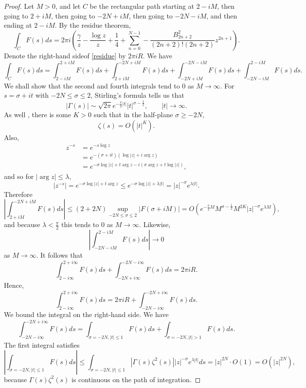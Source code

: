 \documentclass{article}
\begin{document}
\begin{proof}
Let $M>0$,
and let $C$ be the rectangular path  starting at $2-iM$, then going to $2+iM$, then going to $-2N+iM$,  then going to $-2N-iM$, and then ending 
at $2-iM$. 
By the residue theorem,
\begin{equation}
\int_C F(s) ds = 2\pi i\left(\frac{\gamma}{z}-\frac{\log z}{z}+\frac{1}{4} + \sum_{n=0}^{N-1}  -\frac{B_{2n+2}^2}{(2n+2)!(2n+2)} z^{2n+1}
\right).
\label{residue}
\end{equation}
Denote the right-hand sideof \eqref{residue}  by $2\pi i R$.
We have
\[
\int_C F(s) ds = 
\int_{2-iM}^{2+iM} F(s) ds + \int_{2+iM}^{-2N+iM} F(s) ds
+ \int_{-2N+iM}^{-2N-iM} F(s) ds +
\int_{-2N-iM}^{2-iM} F(s) ds.
\]
We shall show that the second and fourth integrals tend to $0$ as $M \to \infty$.
For $s=\sigma+it$ with $-2N \leq \sigma \leq 2$, Stirling's formula \cite[p.~151]{functions}  tells us that
\[
|\Gamma(s)| \sim \sqrt{2\pi} e^{-\frac{\pi}{2} |t|} |t|^{\sigma-\frac{1}{2}}, \qquad |t| \to \infty.
\]
As well \cite[p.~95]{zeta},
there is some $K>0$  such that in the half-plane $\sigma \geq -2N$,
\[
\zeta(s)=O(|t|^K).
\]
Also,
\begin{align*}
z^{-s} &= e^{-s \log z}\\
& = e^{-(\sigma+it)(\log |z|+i\arg z)} \\
&= e^{-\sigma \log|z| + t \arg z - i(\sigma \arg z+t \log|z|)},
\end{align*}
and so for $|\arg z| \leq \lambda$,
\[
|z^{-s}| = e^{-\sigma \log|z| + t \arg z}  \leq e^{-\sigma \log |z|+\lambda |t|} = |z|^{-\sigma} e^{\lambda |t|}.
\]
Therefore
\[
\left| \int_{2+iM}^{-2N+iM} F(s) ds \right| 
\leq (2+2N) \sup_{-2N \leq \sigma \leq 2} |F(\sigma+iM)|
=O(e^{-\frac{\pi}{2} M} M^{\sigma-\frac{1}{2}} M^{2K}  |z|^{-\sigma} e^{\lambda M}),
\]
and because $\lambda<\frac{\pi}{2}$ this tends to $0$ as $M \to \infty$.
Likewise,
\[
\left|\int_{-2N-iM}^{2-iM} F(s) ds \right| \to 0
\]
as $M \to \infty$. It follows that
\[
\int_{2-i\infty}^{2+i\infty} F(s) ds +\int_{-2N+i\infty}^{-2N-i\infty} F(s) ds
=2\pi i R.
\]
Hence,
\[
\int_{2-i\infty}^{2+i\infty} F(s) ds = 2\pi i R + \int_{-2N-i\infty}^{-2N+i\infty} F(s) ds.
\]
We bound the integral on the right-hand side. We have
\[
 \int_{-2N-i\infty}^{-2N+i\infty} F(s) ds = 
  \int_{\sigma=-2N, |t| \leq 1} F(s) ds+
    \int_{\sigma=-2N, |t| > 1} F(s)ds.
\]
The first integral satisfies
\[
\left|   \int_{\sigma=-2N, |t| \leq 1} F(s) ds \right|
\leq  \int_{\sigma=-2N, |t| \leq 1} |\Gamma(s) \zeta^2(s)|  |z|^{-\sigma} e^{\lambda |t|}
ds
= |z|^{2N} \cdot O(1) = O(|z|^{2N}),
\]
because $\Gamma(s) \zeta^2(s)$ is continuous on the path of integration.

\end{proof}
\end{document}
